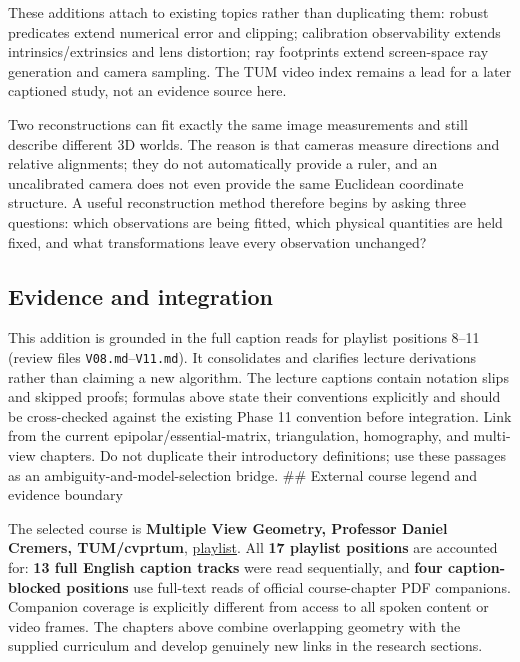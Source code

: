 These additions attach to existing topics rather than duplicating them: robust predicates extend numerical error and clipping; calibration observability extends intrinsics/extrinsics and lens distortion; ray footprints extend screen-space ray generation and camera sampling. The TUM video index remains a lead for a later captioned study, not an evidence source here.

Two reconstructions can fit exactly the same image measurements and still describe different 3D worlds. The reason is that cameras measure directions and relative alignments; they do not automatically provide a ruler, and an uncalibrated camera does not even provide the same Euclidean coordinate structure. A useful reconstruction method therefore begins by asking three questions: which observations are being fitted, which physical quantities are held fixed, and what transformations leave every observation unchanged?

\subsection{Evidence and integration}\label{02-foundations-ii-ch039-evidence-and-integration}

This addition is grounded in the full caption reads for playlist positions 8--11 (review files \texttt{V08.md}--\texttt{V11.md}). It consolidates and clarifies lecture derivations rather than claiming a new algorithm. The lecture captions contain notation slips and skipped proofs; formulas above state their conventions explicitly and should be cross-checked against the existing Phase 11 convention before integration. Link from the current epipolar/essential-matrix, triangulation, homography, and multi-view chapters. Do not duplicate their introductory definitions; use these passages as an ambiguity-and-model-selection bridge. \#\# External course legend and evidence boundary

The selected course is \textbf{Multiple View Geometry, Professor Daniel Cremers, TUM/cvprtum}, \href{https://www.youtube.com/playlist?list=PLTBdjV_4f-EJn6udZ34tht9EVIW7lbeo4}{playlist}. All \textbf{17 playlist positions} are accounted for: \textbf{13 full English caption tracks} were read sequentially, and \textbf{four caption-blocked positions} use full-text reads of official course-chapter PDF companions. Companion coverage is explicitly different from access to all spoken content or video frames. The chapters above combine overlapping geometry with the supplied curriculum and develop genuinely new links in the research sections.

